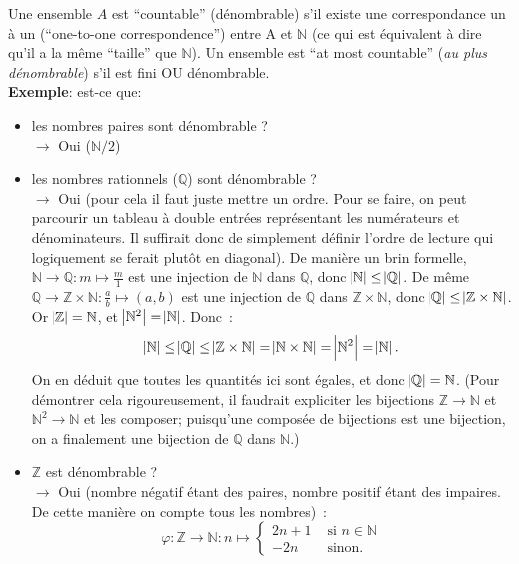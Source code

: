 \documentclass[a4paper,12pt]{article}
\begin{document}
  Une ensemble $A$ est ``countable'' (dénombrable) s'il existe une correspondance un à un (``one-to-one correspondence'') entre A et $\mathbb{N}$ (ce qui est équivalent à dire qu'il a la même ``taille'' que $\mathbb{N}$). Un ensemble est ``at most countable'' (\textit{au plus dénombrable}) s'il est fini OU dénombrable.\\
  \textbf{Exemple}: est-ce que:
  \begin{itemize}
    \item les nombres paires sont dénombrable ?\\
      $\rightarrow$ Oui ($\mathbb{N} / 2$)

    \item les nombres rationnels ($\mathbb{Q}$) sont dénombrable ?\\
      $\rightarrow$ Oui (pour cela il faut juste mettre un ordre.  Pour se faire, on peut parcourir un tableau à double entrées représentant les numérateurs et dénominateurs. Il suffirait donc de simplement définir l'ordre de lecture qui logiquement se ferait plutôt en diagonal).  %
			De manière un brin formelle, $\mathbb N \to \mathbb Q : m \mapsto \frac m1$ est une injection de $\mathbb N$ dans $\mathbb Q$, donc $\abs {\mathbb N} \leq \abs {\mathbb Q}$.
			De même $\mathbb Q \to \mathbb Z \times \mathbb N : \frac ab \mapsto (a, b)$ est une injection de $\mathbb Q$ dans $\mathbb Z \times \mathbb N$,
			donc $\abs {\mathbb Q} \leq \abs {\mathbb Z \times \mathbb N}$. Or $\abs {\mathbb Z} = \mathbb N$, et $\abs {\mathbb N^2} = \abs {\mathbb N}$. Donc~:
			\[\abs {\mathbb N} \leq \abs {\mathbb Q} \leq \abs {\mathbb Z \times \mathbb N} = \abs {\mathbb N \times \mathbb N} = \abs {\mathbb N^2} = \abs {\mathbb N}.\]
			On en déduit que toutes les quantités ici sont égales, et donc $\abs {\mathbb Q} = \mathbb N$. (Pour démontrer cela rigoureusement, il faudrait expliciter
			les bijections $\mathbb Z \to \mathbb N$ et $\mathbb N^2 \to \mathbb N$ et les composer; puisqu'une composée de bijections est une bijection, on a finalement
			une bijection de $\mathbb Q$ dans $\mathbb N$.)

    \item $\mathbb{Z}$ est dénombrable ?\\
      $\rightarrow$ Oui (nombre négatif étant des paires, nombre positif étant des impaires. De cette manière on compte tous les nombres)~:
			\[\varphi : \mathbb Z \to \mathbb N : n \mapsto \begin{cases}2n+1 &\text{ si } n \in \mathbb N\\-2n &\text{ sinon.}\end{cases}\]
  \end{itemize}
\end{document}
